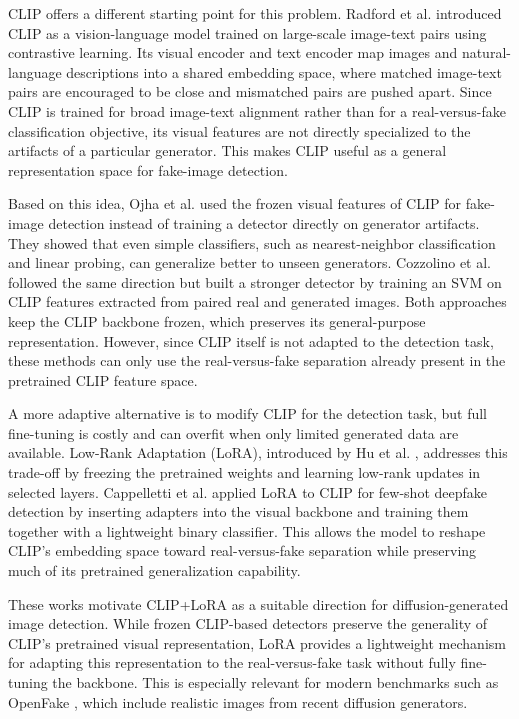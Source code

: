 CLIP offers a different starting point for this problem. Radford et al. \cite{radford2021clip} introduced CLIP as a vision-language model trained on large-scale image-text pairs using contrastive learning. Its visual encoder and text encoder map images and natural-language descriptions into a shared embedding space, where matched image-text pairs are encouraged to be close and mismatched pairs are pushed apart. Since CLIP is trained for broad image-text alignment rather than for a real-versus-fake classification objective, its visual features are not directly specialized to the artifacts of a particular generator. This makes CLIP useful as a general representation space for fake-image detection.

Based on this idea, Ojha et al. \cite{ojha2023universal} used the frozen visual features of CLIP for fake-image detection instead of training a detector directly on generator artifacts. They showed that even simple classifiers, such as nearest-neighbor classification and linear probing, can generalize better to unseen generators. Cozzolino et al. \cite{cozzolino2024clipdetect} followed the same direction but built a stronger detector by training an SVM on CLIP features extracted from paired real and generated images. Both approaches keep the CLIP backbone frozen, which preserves its general-purpose representation. However, since CLIP itself is not adapted to the detection task, these methods can only use the real-versus-fake separation already present in the pretrained CLIP feature space.

A more adaptive alternative is to modify CLIP for the detection task, but full fine-tuning is costly and can overfit when only limited generated data are available. Low-Rank Adaptation (LoRA), introduced by Hu et al. \cite{hu2022lora}, addresses this trade-off by freezing the pretrained weights and learning low-rank updates in selected layers. Cappelletti et al. \cite{cappelletti2024lora} applied LoRA to CLIP for few-shot deepfake detection by inserting adapters into the visual backbone and training them together with a lightweight binary classifier. This allows the model to reshape CLIP's embedding space toward real-versus-fake separation while preserving much of its pretrained generalization capability.

These works motivate CLIP+LoRA as a suitable direction for diffusion-generated image detection. While frozen CLIP-based detectors preserve the generality of CLIP's pretrained visual representation, LoRA provides a lightweight mechanism for adapting this representation to the real-versus-fake task without fully fine-tuning the backbone. This is especially relevant for modern benchmarks such as OpenFake \cite{livernoche2025openfake}, which include realistic images from recent diffusion generators.


